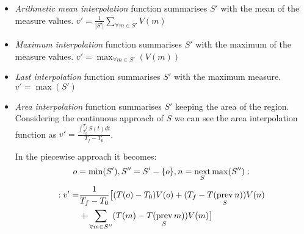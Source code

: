 \begin{itemize}

\item \emph{Arithmetic mean interpolation} function summarises $S'$
  with the mean of the measure values.
  $
  v' = \frac{1}{|S'|} \sum\limits_{\forall m\in S'} V(m)
  $

\item \emph{Maximum interpolation} function summarises $S'$ with the
  maximum of the measure values.
  $
  v' = \max_{\forall m \in S'}(V(m))
  $
\item \emph{Last interpolation} function summarises $S'$ with the
  maximum measure.
  $
  v' = \max(S')
  $

\item \emph{Area interpolation} function summarises $S'$ keeping the
  area of the region. Considering the continuous approach of $S$ we
  can see the area interpolation function as $v' =
  \frac{\int_{T_0}^{T_f} S(t) dt}{T_f - T_0}$.  

In the piecewise  approach it becomes:
  \[
  o=\min(S'),
  S''= S' - \{o\},
  n=\operatorname*{next}_{S} \max(S''): 
  \]
  \[
  \begin{split}
  :v'  = & \frac{1}{T_f-T_0} 
  \big[ (T(o)-T_0)V(o) +( T_f- T(\operatorname*{prev}_{S} n) )V(n) \\
    & {}+\sum\limits_{\forall m \in S''}( T(m)- T(\operatorname*{prev}_S m) )V(m) \big]   
   \end{split}
  \]
  

\end{itemize}















